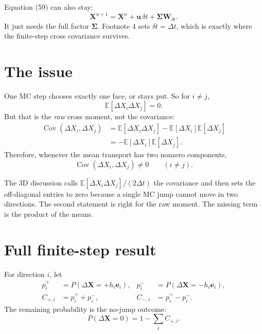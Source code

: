 \documentclass[11pt]{article}
\newcommand{\ddX}{\Delta\mathbf{X}}
\newcommand{\mean}[1]{\mathbb{E}\!\left[#1\right]}
\newcommand{\cov}{\operatorname{Cov}}
\begin{document}
Equation (59) can also stay:
\begin{equation}
  \mathbf{X}^{n+1}
  =
  \mathbf{X}^{n}
  +
  \mathbf{u}\,\delta t
  +
  \boldsymbol{\Sigma}\mathbf{W}_{\delta t}.
\end{equation}
It just needs the full factor \(\boldsymbol{\Sigma}\).
Footnote 4 sets \(\delta t=\Delta t\), which is exactly where the finite-step
cross covariance survives.

\section*{The issue}

One MC step chooses exactly one face, or stays put. So for \(i\neq j\),
\begin{equation}
  \mean{\Delta X_i\Delta X_j}=0.
\end{equation}
But that is the \emph{raw} cross moment, not the covariance:
\begin{align}
  \cov(\Delta X_i,\Delta X_j)
  &=
  \mean{\Delta X_i\Delta X_j}
  -\mean{\Delta X_i}\mean{\Delta X_j}
  \\
  &=
  -\mean{\Delta X_i}\mean{\Delta X_j}.
\end{align}
Therefore, whenever the mean transport has two nonzero components,
\begin{equation}
  \boxed{
  \cov(\Delta X_i,\Delta X_j)\neq0
  \qquad (i\neq j).
  }
\end{equation}

The 3D discussion calls
\(\mean{\Delta X_i\Delta X_j}/(2\Delta t)\) the covariance and then sets the
off-diagonal entries to zero because a single MC jump cannot move in two
directions. The second statement is right for the raw moment. The missing term
is the product of the means.

\section*{Full finite-step result}

For direction \(i\), let
\begin{align}
  p_i^+ &= P(\ddX=+h_i\mathbf{e}_i), &
  p_i^- &= P(\ddX=-h_i\mathbf{e}_i),\\
  C_{+,i} &= p_i^+ + p_i^-, &
  C_{-,i} &= p_i^+ - p_i^- .
\end{align}
The remaining probability is the no-jump outcome:
\begin{equation}
  P(\ddX=0)=1-\sum_i C_{+,i}.
\end{equation}
\end{document}

